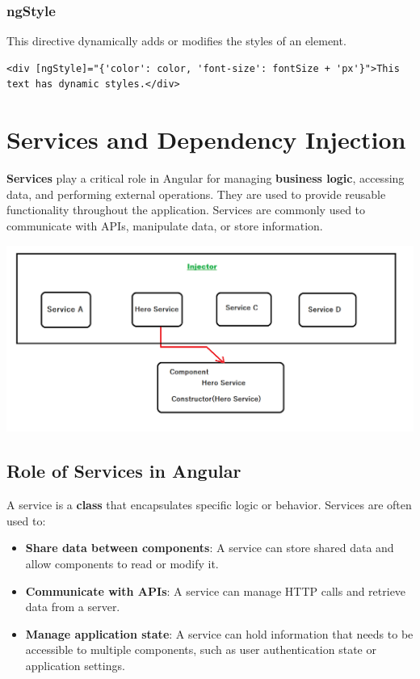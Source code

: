 \documentclass{article}
\begin{document}
\subsubsection{ngStyle}

This directive dynamically adds or modifies the styles of an element.
\begin{verbatim}
<div [ngStyle]="{'color': color, 'font-size': fontSize + 'px'}">This text has dynamic styles.</div>
\end{verbatim}

\section{Services and Dependency Injection}

\textbf{Services} play a critical role in Angular for managing \textbf{business logic}, accessing data, and performing external operations. They are used to provide reusable functionality throughout the application. Services are commonly used to communicate with APIs, manipulate data, or store information.
\begin{tcolorbox}[colframe=black!70, colback=white, title=Figure 7: Services and Dependency Injection, fonttitle=\bfseries]
\centering
\includegraphics[width=\textwidth]{images/0_R0nqYsF51ACGiI_K.png}
\end{tcolorbox}

\subsection{Role of Services in Angular}

A service is a \textbf{class} that encapsulates specific logic or behavior. Services are often used to:
\begin{itemize}
  \item \textbf{Share data between components}: A service can store shared data and allow components to read or modify it.
  \item \textbf{Communicate with APIs}: A service can manage HTTP calls and retrieve data from a server.
  \item \textbf{Manage application state}: A service can hold information that needs to be accessible to multiple components, such as user authentication state or application settings.
\end{itemize}
\end{document}
